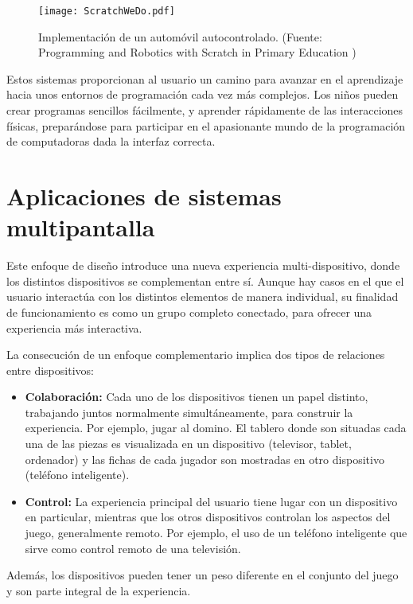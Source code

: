 \begin{figure}[!h]
\begin{center}
\texttt{[image: ScratchWeDo.pdf]}
\caption{Implementación de un automóvil autocontrolado. (Fuente: Programming and Robotics with Scratch in Primary Education \cite{ScratchWeDo})}
\label{fig:ScratchWeDo}
\end{center}
\end{figure}



Estos sistemas proporcionan al usuario un camino para avanzar en el aprendizaje hacia unos entornos de programación cada vez más complejos. Los niños pueden crear programas sencillos fácilmente, y aprender rápidamente de las interacciones físicas, preparándose para participar en el apasionante mundo de la programación de computadoras dada la interfaz correcta.



\section{Aplicaciones de sistemas multipantalla}
Este enfoque de diseño introduce una nueva experiencia multi-dispositivo, donde los distintos dispositivos se complementan entre sí. Aunque hay casos en el que el usuario interactúa con los distintos elementos de manera individual, su finalidad de funcionamiento es como un grupo completo conectado, para ofrecer una experiencia más interactiva.

La consecución de un enfoque complementario implica dos tipos de relaciones entre dispositivos:
\begin{itemize}
\item \textbf{Colaboración:} Cada uno de los dispositivos tienen un papel distinto, trabajando juntos normalmente simultáneamente, para construir la experiencia. Por ejemplo, jugar al domino. El tablero donde son situadas cada una de las piezas es visualizada en un dispositivo (televisor, tablet, ordenador) y las fichas de cada jugador son mostradas en otro dispositivo (teléfono inteligente).

\item \textbf{Control:} La experiencia principal del usuario tiene lugar con un dispositivo en particular, mientras que los otros dispositivos controlan los aspectos del juego, generalmente remoto. Por ejemplo, el uso de un teléfono inteligente que sirve como control remoto de una televisión.
\end{itemize}
Además, los dispositivos pueden tener un peso diferente en el conjunto del juego y son parte integral de la experiencia. 


